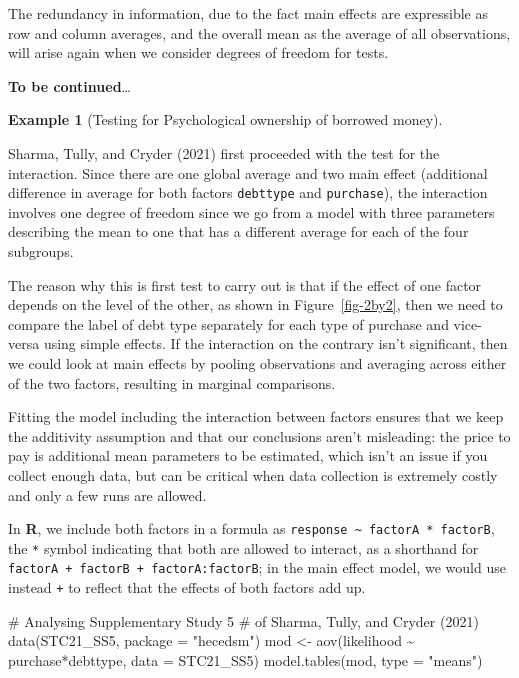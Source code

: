\documentclass[
  11pt,
  letterpaper,
]{scrbook}
\newenvironment{Shaded}{\begin{snugshade}}{\end{snugshade}}
\newcommand{\AttributeTok}[1]{\textcolor[rgb]{0.40,0.45,0.13}{#1}}
\newcommand{\CommentTok}[1]{\textcolor[rgb]{0.37,0.37,0.37}{#1}}
\newcommand{\FunctionTok}[1]{\textcolor[rgb]{0.28,0.35,0.67}{#1}}
\newcommand{\NormalTok}[1]{\textcolor[rgb]{0.00,0.23,0.31}{#1}}
\newcommand{\OtherTok}[1]{\textcolor[rgb]{0.00,0.23,0.31}{#1}}
\newcommand{\SpecialCharTok}[1]{\textcolor[rgb]{0.37,0.37,0.37}{#1}}
\newcommand{\StringTok}[1]{\textcolor[rgb]{0.13,0.47,0.30}{#1}}
\theoremstyle{definition}
\theoremstyle{definition}
\newtheorem{example}{Example}[chapter]
\theoremstyle{remark}
\begin{document}
The redundancy in information, due to the fact main effects are
expressible as row and column averages, and the overall mean as the
average of all observations, will arise again when we consider degrees
of freedom for tests.

\textbf{To be continued}\ldots{}

\begin{example}[Testing for Psychological ownership of borrowed
money]\protect\hypertarget{exm-borrowed-money-test}{}\label{exm-borrowed-money-test}

Sharma, Tully, and Cryder (2021) first proceeded with the test for the
interaction. Since there are one global average and two main effect
(additional difference in average for both factors \texttt{debttype} and
\texttt{purchase}), the interaction involves one degree of freedom since
we go from a model with three parameters describing the mean to one that
has a different average for each of the four subgroups.

The reason why this is first test to carry out is that if the effect of
one factor depends on the level of the other, as shown in
Figure~\ref{fig-2by2}, then we need to compare the label of debt type
separately for each type of purchase and vice-versa using simple
effects. If the interaction on the contrary isn't significant, then we
could look at main effects by pooling observations and averaging across
either of the two factors, resulting in marginal comparisons.

Fitting the model including the interaction between factors ensures that
we keep the additivity assumption and that our conclusions aren't
misleading: the price to pay is additional mean parameters to be
estimated, which isn't an issue if you collect enough data, but can be
critical when data collection is extremely costly and only a few runs
are allowed.

In \textbf{R}, we include both factors in a formula as
\texttt{response\ \textasciitilde{}\ factorA\ *\ factorB}, the
\texttt{*} symbol indicating that both are allowed to interact, as a
shorthand for \texttt{factorA\ +\ factorB\ +\ factorA:factorB}; in the
main effect model, we would use instead \texttt{+} to reflect that the
effects of both factors add up.

\begin{Shaded}
\begin{Highlighting}[]
\CommentTok{\# Analysing Supplementary Study 5}
\CommentTok{\# of Sharma, Tully, and Cryder (2021)}
\FunctionTok{data}\NormalTok{(STC21\_SS5, }\AttributeTok{package =} \StringTok{"hecedsm"}\NormalTok{)}
\NormalTok{mod }\OtherTok{\textless{}{-}} \FunctionTok{aov}\NormalTok{(likelihood }\SpecialCharTok{\textasciitilde{}}\NormalTok{ purchase}\SpecialCharTok{*}\NormalTok{debttype, }
           \AttributeTok{data =}\NormalTok{ STC21\_SS5)}
\FunctionTok{model.tables}\NormalTok{(mod, }\AttributeTok{type =} \StringTok{"means"}\NormalTok{)}
\end{Highlighting}
\end{Shaded}


\end{example}
\end{document}
